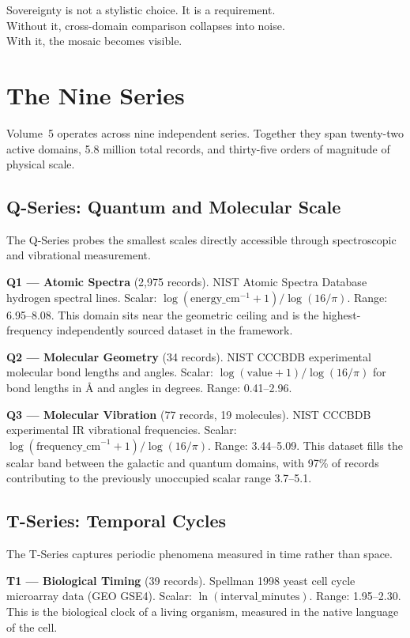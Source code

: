 \documentclass[11pt, letterpaper, openany]{book}
\begin{document}
Sovereignty is not a stylistic choice. It is a requirement.\\
Without it, cross-domain comparison collapses into noise.\\
With it, the mosaic becomes visible.

\section*{The Nine Series}

Volume~5 operates across nine independent series. Together they span twenty-two active domains,
5.8 million total records, and thirty-five orders of magnitude of physical scale.

\subsection*{Q-Series: Quantum and Molecular Scale}

The Q-Series probes the smallest scales directly accessible through spectroscopic and
vibrational measurement.

\textbf{Q1 --- Atomic Spectra} (2,975 records). NIST Atomic Spectra Database hydrogen spectral
lines. Scalar: $\log(\text{energy\_cm}^{-1} + 1)/\log(16/\pi)$. Range: 6.95--8.08. This
domain sits near the geometric ceiling and is the highest-frequency independently sourced
dataset in the framework.

\textbf{Q2 --- Molecular Geometry} (34 records). NIST CCCBDB experimental molecular bond
lengths and angles. Scalar: $\log(\text{value} + 1)/\log(16/\pi)$ for bond lengths in {\AA}
and angles in degrees. Range: 0.41--2.96.

\textbf{Q3 --- Molecular Vibration} (77 records, 19 molecules). NIST CCCBDB experimental IR
vibrational frequencies. Scalar: $\log(\text{frequency\_cm}^{-1} + 1)/\log(16/\pi)$. Range:
3.44--5.09. This dataset fills the scalar band between the galactic and quantum domains, with
97\% of records contributing to the previously unoccupied scalar range 3.7--5.1.

\subsection*{T-Series: Temporal Cycles}

The T-Series captures periodic phenomena measured in time rather than space.

\textbf{T1 --- Biological Timing} (39 records). Spellman 1998 yeast cell cycle microarray data
(GEO GSE4). Scalar: $\ln(\text{interval\_minutes})$. Range: 1.95--2.30. This is the biological
clock of a living organism, measured in the native language of the cell.
\end{document}
